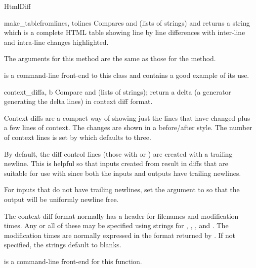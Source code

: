 \begin{classdesc*}{HtmlDiff}
  \begin{funcdesc}{make_table}{fromlines, tolines
    }
    Compares  and  (lists of strings) and returns
    a string which is a complete HTML table showing line by line differences
    with inter-line and intra-line changes highlighted.

    The arguments for this method are the same as those for the
     method.
  \end{funcdesc}

   is a command-line front-end to this class
  and contains a good example of its use.

\end{classdesc*}

\begin{funcdesc}{context_diff}{a, b}
  Compare  and  (lists of strings); return a
  delta (a generator generating the delta lines) in context diff
  format.

  Context diffs are a compact way of showing just the lines that have
  changed plus a few lines of context.  The changes are shown in a
  before/after style.  The number of context lines is set by 
  which defaults to three.

  By default, the diff control lines (those with \code{***} or \code{---})
  are created with a trailing newline.  This is helpful so that inputs created
  from  result in diffs that are suitable for use
  with  since both the inputs and outputs have
  trailing newlines.

  For inputs that do not have trailing newlines, set the 
  argument to  so that the output will be uniformly newline free.

  The context diff format normally has a header for filenames and
  modification times.  Any or all of these may be specified using strings for
  , , , and .
  The modification times are normally expressed in the format returned by
  .  If not specified, the strings default to blanks.

   is a command-line front-end for this
  function.

\end{funcdesc}

